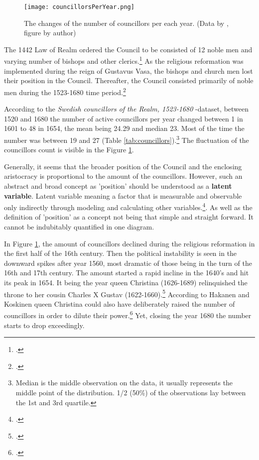 \begin{figure}
	\texttt{[image: councillorsPerYear.png]}
	\centering
	\caption[The changes of the number of councillors per each year 1520-1680]{The changes of the number of councillors per each year. (Data by \cite{councillorsDS}, figure by author)} 
	\centering
	\label{fig:peryear}
\end{figure}

The 1442 Law of Realm ordered the Council to be consisted of 12 noble men and varying number of bishops and other clerics.\footcite[p. 49.]{HakanenAKoskinen2017} As the religious reformation was implemented during the reign of Gustavus Vasa, the bishops and church men lost their position in the Council. Thereafter, the Council consisted primarily of noble men during the 1523-1680 time period.\footcites[pp. 72-75,]{pSuurvalta}[p. 15]{agencyAndStateBuilding} 

According to the \textit{Swedish councillors of the Realm, 1523-1680} -dataset, between 1520 and 1680 the number of active councillors per year changed between 1 in 1601 to 48 in 1654, the mean being 24.29 and median 23. Most of the time the number was between 19 and 27 (Table \ref{tab:councillors}).\footnote{Median is the middle observation on the data, it usually represents the middle point of the distribution.\cites[p. 26,]{statisticsfor}[pp. 30-31.]{MooreEtAl} 1/2 (50\%) of the observations lay between the 1st and 3rd quartile.\cite[pp. 32-33.]{MooreEtAl}} The fluctuation of the councillors count is visible in the Figure \ref{fig:peryear}. 

Generally, it seems that the broader position of the Council and the enclosing aristocracy is proportional to the amount of the councillors. However, such an abstract and broad concept as 'position' should be understood as a \textbf{latent variable}. Latent variable meaning a factor that is measurable and observable only indirectly through modeling and calculating other variables.\footcite{apa}. As well as the definition of 'position' as a concept not being that simple and straight forward. It cannot be indubitably quantified in one diagram.

In Figure \ref{fig:peryear}, the amount of councillors declined during the religious reformation in the first half of the 16th century. Then the political instability is seen in the downward spikes after year 1560, most dramatic of those being in the turn of the 16th and 17th century. The amount started a rapid incline in the 1640's and hit its peak in 1654. It being the year queen Christina (1626-1689) relinquished the throne to her cousin Charles X Gustav (1622-1660).\footcite[pp. 8-9.]{personalAgency} According to Hakanen and Koskinen queen Christina could also have deliberately raised the number of councillors in order to dilute their power.\footcite[pp. 63-64.]{HakanenAKoskinen2017} Yet, closing the year 1680 the number starts to drop exceedingly.

